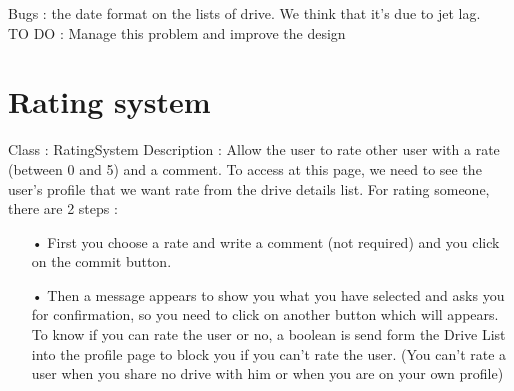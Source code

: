 Bugs : the date format on the lists of drive. We think that it’s due to jet lag.\\
TO DO :  Manage this problem and improve the design

\section{Rating system}

Class : RatingSystem \newline
Description : Allow the user to rate other user with a rate (between 0 and 5) and a comment. To access at this page, we need to see the user’s profile that we want rate from the drive details list.  \newline
For rating someone, there are 2 steps : 
\begin{enumerate}
\item[•]First you choose a rate and write a comment (not required) and you click on the commit button. 
\item[•] Then a message appears to show you what you have selected and asks you for confirmation, so you need to click on another button which will appears.\\ 

To know if you can rate the user or no, a boolean is send form the Drive List into the profile page to block you if you can’t rate the user. (You can’t rate a user when you share no drive with him or when you are on your own profile)

\end{enumerate}

